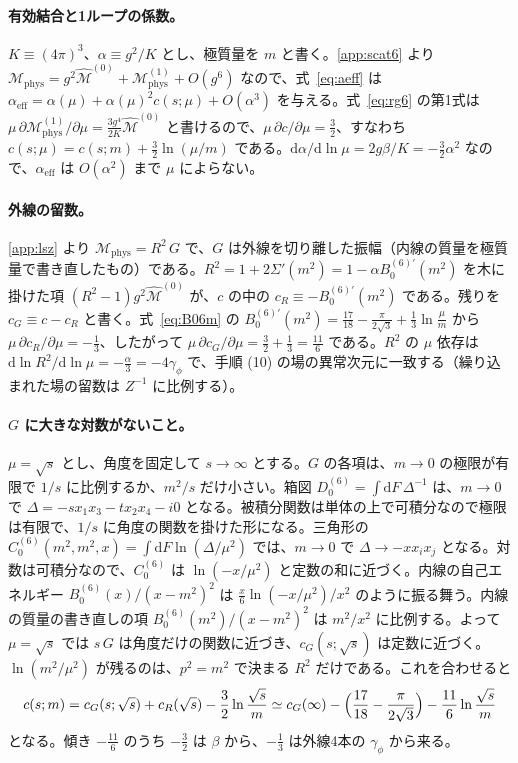 \documentclass[a4paper,10pt]{ltjsarticle}
\newcommand{\dd}{\mathrm{d}}
\begin{document}
\paragraph{有効結合と1ループの係数。}$K\equiv(4\pi)^3$、$\alpha\equiv g^2/K$ とし、極質量を $m$ と書く。\ref{app:scat6} より $\mathcal{M}_{\mathrm{phys}}=g^2\hat{\mathcal M}^{(0)}+\mathcal{M}^{(1)}_{\mathrm{phys}}+O(g^6)$ なので、式~\eqref{eq:aeff} は $\alpha_{\mathrm{eff}}=\alpha(\mu)+\alpha(\mu)^2c(s;\mu)+O(\alpha^3)$ を与える。式~\eqref{eq:rg6} の第1式は $\mu\,\partial\mathcal{M}^{(1)}_{\mathrm{phys}}/\partial\mu=\frac{3g^4}{2K}\hat{\mathcal M}^{(0)}$ と書けるので、$\mu\,\partial c/\partial\mu=\frac32$、すなわち $c(s;\mu)=c(s;m)+\frac32\ln(\mu/m)$ である。$\dd\alpha/\dd\ln\mu=2g\beta/K=-\frac32\alpha^2$ なので、$\alpha_{\mathrm{eff}}$ は $O(\alpha^2)$ まで $\mu$ によらない。

\paragraph{外線の留数。}\ref{app:lsz} より $\mathcal{M}_{\mathrm{phys}}=R^2\,G$ で、$G$ は外線を切り離した振幅（内線の質量を極質量で書き直したもの）である。$R^2=1+2\Sigma'(m^2)=1-\alpha B_0^{(6)\prime}(m^2)$ を木に掛けた項 $(R^2-1)g^2\hat{\mathcal M}^{(0)}$ が、$c$ の中の $c_R\equiv-B_0^{(6)\prime}(m^2)$ である。残りを $c_G\equiv c-c_R$ と書く。式~\eqref{eq:B06m} の $B_0^{(6)\prime}(m^2)=\frac{17}{18}-\frac{\pi}{2\sqrt3}+\frac13\ln\frac\mu m$ から $\mu\,\partial c_R/\partial\mu=-\frac13$、したがって $\mu\,\partial c_G/\partial\mu=\frac32+\frac13=\frac{11}{6}$ である。$R^2$ の $\mu$ 依存は $\dd\ln R^2/\dd\ln\mu=-\frac\alpha3=-4\gamma_\phi$ で、手順 (10) の場の異常次元に一致する（繰り込まれた場の留数は $Z^{-1}$ に比例する）。

\paragraph{$G$ に大きな対数がないこと。}$\mu=\sqrt s$ とし、角度を固定して $s\to\infty$ とする。$G$ の各項は、$m\to0$ の極限が有限で $1/s$ に比例するか、$m^2/s$ だけ小さい。箱図 $D_0^{(6)}=\int\dd F\,\Delta^{-1}$ は、$m\to0$ で $\Delta=-sx_1x_3-tx_2x_4-i0$ となる。被積分関数は単体の上で可積分なので極限は有限で、$1/s$ に角度の関数を掛けた形になる。三角形の $C_0^{(6)}(m^2,m^2,x)=\int\dd F\ln(\Delta/\mu^2)$ では、$m\to0$ で $\Delta\to-xx_ix_j$ となる。対数は可積分なので、$C_0^{(6)}$ は $\ln(-x/\mu^2)$ と定数の和に近づく。内線の自己エネルギー $B_0^{(6)}(x)/(x-m^2)^2$ は $\frac x6\ln(-x/\mu^2)/x^2$ のように振る舞う。内線の質量の書き直しの項 $B_0^{(6)}(m^2)/(x-m^2)^2$ は $m^2/x^2$ に比例する。よって $\mu=\sqrt s$ では $s\,G$ は角度だけの関数に近づき、$c_G(s;\sqrt s)$ は定数に近づく。$\ln(m^2/\mu^2)$ が残るのは、$p^2=m^2$ で決まる $R^2$ だけである。これを合わせると
\begin{equation*}
c(s;m)=c_G(s;\sqrt s)+c_R(\sqrt s)-\frac32\ln\frac{\sqrt s}{m}\simeq c_G(\infty)-\Bigl(\frac{17}{18}-\frac{\pi}{2\sqrt3}\Bigr)-\frac{11}{6}\ln\frac{\sqrt s}{m}
\end{equation*}
となる。傾き $-\frac{11}{6}$ のうち $-\frac32$ は $\beta$ から、$-\frac13$ は外線4本の $\gamma_\phi$ から来る。
\end{document}
